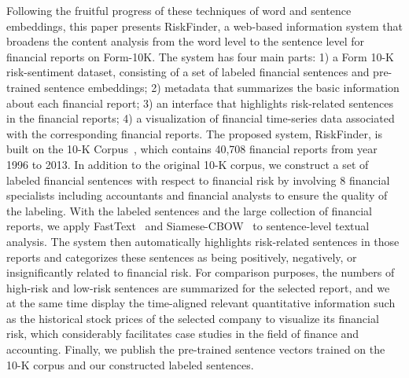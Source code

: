 \documentclass[10pt,conference,letterpaper]{IEEEtran}
\begin{document}
    Following the fruitful progress of these techniques of word and sentence embeddings, this paper presents RiskFinder, a web-based information system that broadens the content analysis from the word level to the sentence level for financial reports on Form-10K. The system has four main parts: 1) a Form 10-K risk-sentiment dataset, consisting of a set of labeled  financial sentences and pre-trained sentence embeddings; 2) metadata that summarizes the basic information about each financial report; 3) an interface that highlights risk-related sentences in the financial reports; 4) a visualization of financial time-series data associated with the corresponding financial reports. The proposed system, RiskFinder, is built on the 10-K Corpus~\cite{liu2016fin10k}, which contains 40,708 financial reports from year 1996 to 2013. In addition to the original 10-K corpus, we construct a set of labeled financial sentences with respect to financial risk by involving 8 financial specialists including accountants and financial analysts to ensure the quality of the labeling. With the labeled sentences and the large collection of financial reports, we apply FastText~\cite{bojanowski2016enriching} and Siamese-CBOW~\cite{kenter2016siamese} to sentence-level textual analysis. The system then automatically highlights risk-related sentences in those reports and categorizes these sentences as being positively, negatively, or insignificantly related to financial risk. For comparison purposes, the numbers of high-risk and low-risk sentences are summarized for the selected report, and we at the same time display the time-aligned relevant quantitative information such as the historical stock prices of the selected company to visualize its financial risk, which considerably facilitates case studies in the field of finance and accounting. Finally, we publish the pre-trained sentence vectors trained on the 10-K corpus and our constructed labeled sentences.
\end{document}
